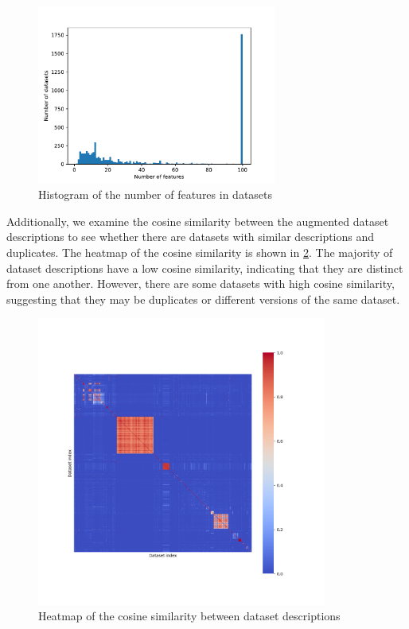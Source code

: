 \begin{figure}[h]
    \centering
    \includegraphics[width=0.7\textwidth]{figures/number_of_features.pdf}
    \caption{Histogram of the number of features in datasets}
    \label{fig:number_of_features}
\end{figure}

Additionally, we examine the cosine similarity between the augmented dataset descriptions to see whether there are datasets with similar descriptions and duplicates. The heatmap of the cosine similarity is shown in \cref{fig:cosine_similarity}. The majority of dataset descriptions have a low cosine similarity, indicating that they are distinct from one another. However, there are some datasets with high cosine similarity, suggesting that they may be duplicates or different versions of the same dataset.

\begin{figure}[h]
    \centering
    \includegraphics[width=0.85\textwidth]{figures/cosine_similarity.png}
    \caption{Heatmap of the cosine similarity between dataset descriptions}
    \label{fig:cosine_similarity}
\end{figure}


